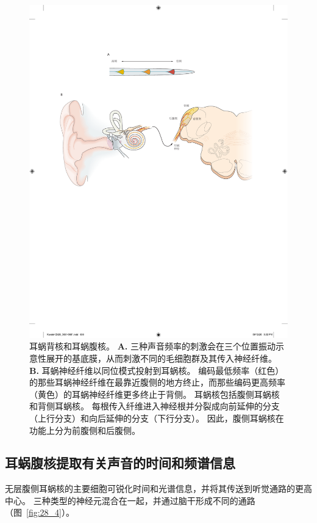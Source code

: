 \begin{figure}[htbp]
	\centering
	\includegraphics[width=1.0\linewidth]{chap28/fig_28_3}
	\caption{耳蜗背核和耳蜗腹核。
		\textbf{A.} 三种声音频率的刺激会在三个位置振动示意性展开的基底膜，从而刺激不同的毛细胞群及其传入神经纤维。
		\textbf{B.} 耳蜗神经纤维以同位模式投射到耳蜗核。
		编码最低频率（红色）的那些耳蜗神经纤维在最靠近腹侧的地方终止，而那些编码更高频率（黄色）的耳蜗神经纤维更多终止于背侧。
		耳蜗核包括腹侧耳蜗核和背侧耳蜗核。
		每根传入纤维进入神经根并分裂成向前延伸的分支（上行分支）和向后延伸的分支（下行分支）。
		因此，腹侧耳蜗核在功能上分为前腹侧和后腹侧。}
	\label{fig:28_3}
\end{figure}



\subsection{耳蜗腹核提取有关声音的时间和频谱信息}

无层腹侧耳蜗核的主要细胞可锐化时间和光谱信息，并将其传送到听觉通路的更高中心。 
三种类型的神经元混合在一起，并通过脑干形成不同的通路（图~\ref{fig:28_4}）。


